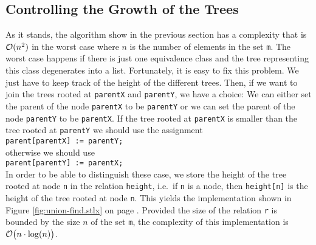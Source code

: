 \subsection{Controlling the Growth of the Trees}
As it stands, the algorithm show in the previous section has a complexity that is $\mathcal{O}(n^2)$ in the
worst case where $n$ is the number of elements in the set \texttt{m}.  The worst case happens if there
is just one equivalence class and the tree representing this class degenerates into a list.
Fortunately, it is easy to fix this problem.  We just have to keep track of the height of the
different trees.  Then, if we want to join the trees rooted at \texttt{parentX} and
\texttt{parentY}, we have a choice: We can either set the parent of the node \texttt{parentX} to
be \texttt{parentY} or we can set the parent of the node \texttt{parentY} to be \texttt{parentX}.
If the tree rooted at \texttt{parentX} is smaller than the tree rooted at \texttt{parentY} we should
use the assignment
\\[0.2cm]
\hspace*{1.3cm}
\texttt{parent[parentX] := parentY;}
\\[0.2cm]
otherwise we should use
\\[0.2cm]
\hspace*{1.3cm}
\texttt{parent[parentY] := parentX;}
\\[0.2cm]
In order to be able to distinguish these case, we store the height of the tree rooted at node
\texttt{n} in the relation \texttt{height}, i.e.~if \texttt{n} is a node, then \texttt{height[n]} is
the height of the tree rooted at node \texttt{n}.  This yields the implementation shown in Figure
\ref{fig:union-find.stlx} on page \pageref{fig:union-find.stlx}.  Provided the size  of the relation
\texttt{r} is bounded by the size $n$ of the set \texttt{m}, the complexity of this
implementation is $\mathcal{O}\bigl(n \cdot \log(n)\bigr)$.


